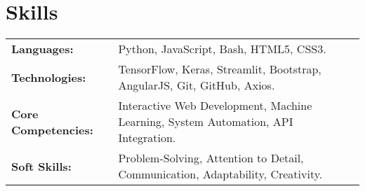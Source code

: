 \documentclass[a4paper,10pt]{article}
\begin{document}
\section{Skills}
\begin{tabularx}{\linewidth}{@{} l X @{}}
    \textbf{Languages:} & Python, JavaScript, Bash, HTML5, CSS3. \\
    \textbf{Technologies:} & TensorFlow, Keras, Streamlit, Bootstrap, AngularJS, Git, GitHub, Axios. \\
    \textbf{Core Competencies:} & Interactive Web Development, Machine Learning, System Automation, API Integration. \\
    \textbf{Soft Skills:} & Problem-Solving, Attention to Detail, Communication, Adaptability, Creativity. \\
\end{tabularx}

\vspace{11pt}


\newcommand{\projectentry}[5]{%
    \noindent\vspace{1pt}
    \textcolor{myblue}{\textbf{\href{#2}{#1}}} \textcolor{mydarkblue}{\href{#3}{\faLink}} \\ \vspace{-10pt}
    \begin{itemize}[left=0pt, label=--, nosep]
        \item \vspace{-10pt}\textbf{Overview:} #4
    \end{itemize}
    \vspace{-13pt}%
}


\vspace{-13pt}
\end{document}
